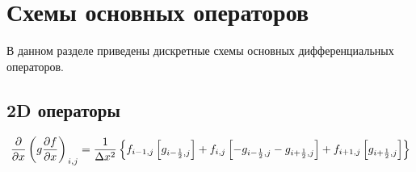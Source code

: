 \section*{Схемы основных операторов}

В данном разделе приведены дискретные схемы основных дифференциальных операторов.

\subsection*{2D операторы}

\begin{equation*}
	\left.
        \frac
	        {\partial }
	        {\partial x}
	    \left(
	        g
	    	\frac
	    	    {\partial f}
	    	    {\partial x}
	    \right)
	\right._{i, j}
	=
	\frac
	    {1}
	    {\Delta x^2}
	\left\{
	    f_{i - 1, j}
	    \left[
		    g_{i - \frac{1}{2}, j}
		\right]
	    +
	    f_{i, j}
	    \left[
		    -
            g_{i - \frac{1}{2}, j}
		    -
            g_{i + \frac{1}{2}, j}
	    \right]
	    +
	    f_{i + 1,j}
	    \left[
		    g_{i + \frac{1}{2}, j}
	    \right]
	\right\}
\end{equation*}

